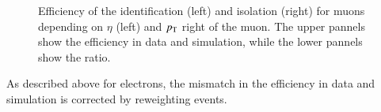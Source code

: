 \begin{figure}[htbp!]
  \begin{center}
\caption{Efficiency of the identification (left) and isolation (right) for muons depending on $\eta$ (left) and $p_{\mathrm{T}}$ right of the muon.
         The upper pannels show the efficiency in data and simulation, while the lower pannels show the ratio.
  \label{fig:reco_mueff}}
  \end{center}
\end{figure}

As described above for electrons, the mismatch in the efficiency in data and simulation is corrected by reweighting events.

